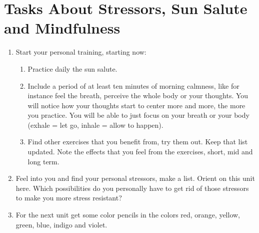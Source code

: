 \documentclass[../main.tex]{subfiles}
\begin{document}
  \section[Tasks]{Tasks About Stressors, Sun Salute and Mindfulness}
  \label{Ex:MorningCalm}
  \begin{enumerate}[label = \Alph*]
  \item Start your personal training, starting now:
    \begin{enumerate}
    \item Practice daily the sun salute.
    \item Include a period of at least ten minutes of morning calmness, like for instance feel the breath, perceive the whole body or your thoughts.
      You will notice how your thoughts start to center more and more, the more you practice.
      You will be able to just focus on your breath or your body (exhale = let go, inhale = allow to happen).
      \item Find other exercises that you benefit from, try them out. Keep that list updated. Note the effects that you feel from the exercises, short, mid and long term.
      \end{enumerate}
    \item Feel into you and find your personal stressors, make a list. Orient on this unit here.
      Which possibilities do you personally have to get rid of those stressors to make you more stress resistant?
%
    \item For the next unit %
      get some color pencils in the colors red, orange, yellow, green, blue, indigo and violet.
      
\end{enumerate}
\end{document}
